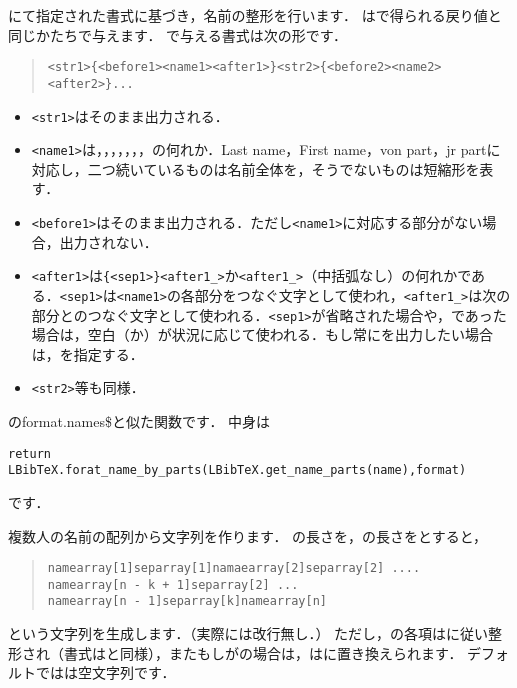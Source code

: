 \documentclass[a4paper]{ltjsarticle}
\begin{document}
にて指定された書式に基づき，名前の整形を行います．
はで得られる戻り値と同じかたちで与えます．
で与える書式は次の形です．
\begin{quote}
\begin{verbatim}
<str1>{<before1><name1><after1>}<str2>{<before2><name2><after2>}...
\end{verbatim}
\end{quote}
\begin{itemize}
\item \verb|<str1>|はそのまま出力される．
\item \verb|<name1>|は，，，，，，，の何れか．Last name，First name，von part，jr partに対応し，二つ続いているものは名前全体を，そうでないものは短縮形を表す．
\item \verb|<before1>|はそのまま出力される．ただし\verb|<name1>|に対応する部分がない場合，出力されない．
\item \verb|<after1>|は\verb|{<sep1>}<after1_>|か\verb|<after1_>|（中括弧なし）の何れかである．\verb|<sep1>|は\verb|<name1>|の各部分をつなぐ文字として使われ，\verb|<after1_>|は次の部分とのつなぐ文字として使われる．\verb|<sep1>|が省略された場合や，\luastring{~}であった場合は，空白（\luastring{ }か\luastring{~}）が状況に応じて使われる．もし常に\luastring{~}を出力したい場合は，\luastring{~~}を指定する．
\item \verb|<str2>|等も同様．
\end{itemize}

\BibTeX のformat.names\$と似た関数です．
中身は
\begin{lstlisting}
return LBibTeX.forat_name_by_parts(LBibTeX.get_name_parts(name),format)
\end{lstlisting}
です．

複数人の名前の配列から文字列を作ります．
の長さを，の長さをとすると，
\begin{quote}
\begin{verbatim}
namearray[1]separray[1]namaearray[2]separray[2] .... 
namearray[n - k + 1]separray[2] ...
namearray[n - 1]separray[k]namearray[n]
\end{verbatim}
\end{quote}
という文字列を生成します．（実際には改行無し．）
ただし，の各項はに従い整形され（書式はと同様），またもしがの場合は，はに置き換えられます．
デフォルトではは空文字列です．
\end{document}

